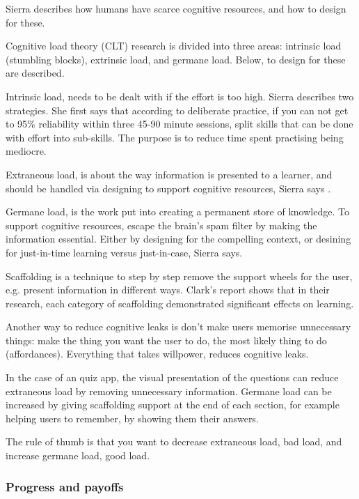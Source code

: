 Sierra \citep{sierra} describes how humans have scarce cognitive resources, and how to design for these.

Cognitive load theory (CLT) research is divided into three areas: intrinsic load (stumbling blocks), extrinsic load, and germane load. Below, to design for these are described.

Intrinsic load, needs to be dealt with if the effort is too high. Sierra \citep{sierra}describes two strategies. She first says that according to deliberate practice, if you can not get to 95\% reliability within three 45-90 minute sessions, split skills that can be done with effort into sub-skills. The purpose is to reduce time spent practising being mediocre.

Extraneous load, is about the way information is presented to a learner, and should be handled via designing to support cognitive resources, Sierra says \citep{sierra}.

Germane load, is the work put into creating a permanent store of knowledge. To support cognitive resources, escape the brain's spam filter by making the information essential. Either by designing for the compelling context, or desining for just-in-time learning versus just-in-case, Sierra says. \citep{sierra}

Scaffolding is a technique to step by step remove the support wheels for the user, e.g. present information in different ways. Clark's \citep{gates} report shows that in their research, each category of scaffolding demonstrated significant effects on learning.

Another way to reduce cognitive leaks is don't make users memorise unnecessary things: make the thing you want the user to do, the most likely thing to do (affordances). Everything that takes willpower, reduces cognitive leaks.

In the case of an quiz app, the visual presentation of the questions can reduce extraneous load by removing unnecessary information. Germane load can be increased by giving scaffolding support at the end of each section, for example helping users to remember, by showing them their answers.

The rule of thumb is that you want to decrease extraneous load, bad load, and increase germane load, good load.

\subsubsection{Progress and payoffs}

